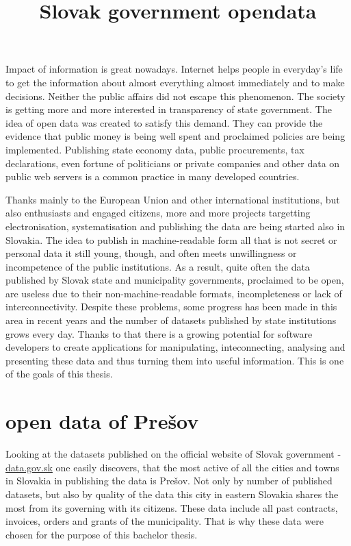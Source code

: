 \documentclass[thesis=B,english]{FITthesis}[2012/06/26]
\title{Slovak government opendata}
\begin{document}
\begin{introduction}
	Impact of information is great nowadays. Internet helps people in everyday's life to get the information about almost everything almost immediately and to make decisions.
	Neither the public affairs did not escape this phenomenon. The society is getting more and more interested in transparency of state government. The idea of open data was created to satisfy this demand. They can provide the evidence that public money is being well spent and proclaimed policies are being implemented. Publishing state economy data, public procurements, tax declarations, even fortune of politicians or private companies and other data on public web servers is a common practice in many developed countries.
	\par Thanks mainly to the European Union and other international institutions, but also enthusiasts and engaged citizens, more and more projects targetting electronisation, systematisation and publishing the data are being started also in Slovakia. The idea to publish in machine-readable form all that is not secret or personal data it still young, though, and often meets unwillingness or incompetence of the public institutions. As a result, quite often the data published by Slovak state and municipality governments, proclaimed to be open, are useless due to their non-machine-readable formats, incompleteness or lack of interconnectivity.
		Despite these problems, some progress has been made in this area in recent years and the number of datasets published by state institutions grows every day. Thanks to that there is a growing potential for software developers to create applications for manipulating, inteconnecting, analysing and presenting these data and thus turning them into useful information. This is one of the goals of this thesis.
	\section*{open data of Prešov}
	Looking at the datasets published on the official website of Slovak government - \href{https://data.gov.sk}{data.gov.sk} one easily discovers, that the most active of all the cities and towns in Slovakia in publishing the data is Prešov. Not only by number of published datasets, but also by quality of the data this city in eastern Slovakia shares the most from its governing with its citizens. These data include all past contracts, invoices, orders and grants of the municipality. That is why these data were chosen for the purpose of this bachelor thesis.

\end{introduction}
\end{document}
